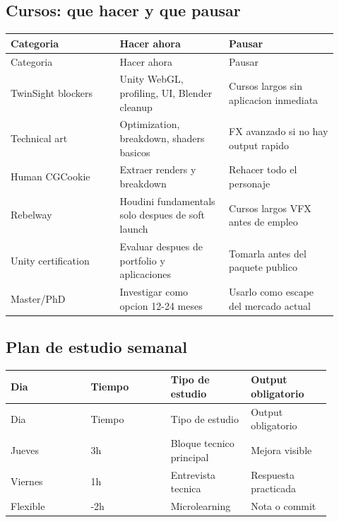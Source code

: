 \subsection{Cursos: que hacer y que pausar}


\begin{center}
\scriptsize
\begin{longtable}{>{\raggedright\arraybackslash}p{0.305\linewidth} >{\raggedright\arraybackslash}p{0.305\linewidth} >{\raggedright\arraybackslash}p{0.305\linewidth}}
\toprule
Categoria & Hacer ahora & Pausar \\
\midrule
\endfirsthead
\toprule
Categoria & Hacer ahora & Pausar \\
\midrule
\endhead
TwinSight blockers & Unity WebGL, profiling, UI, Blender cleanup & Cursos largos sin aplicacion inmediata \\
Technical art & Optimization, breakdown, shaders basicos & FX avanzado si no hay output rapido \\
Human CGCookie & Extraer renders y breakdown & Rehacer todo el personaje \\
Rebelway & Houdini fundamentals solo despues de soft launch & Cursos largos VFX antes de empleo \\
Unity certification & Evaluar despues de portfolio y aplicaciones & Tomarla antes del paquete publico \\
Master/PhD & Investigar como opcion 12-24 meses & Usarlo como escape del mercado actual \\
\bottomrule
\end{longtable}
\end{center}



\subsection{Plan de estudio semanal}


\begin{center}
\scriptsize
\begin{longtable}{>{\raggedright\arraybackslash}p{0.225\linewidth} >{\raggedright\arraybackslash}p{0.225\linewidth} >{\raggedright\arraybackslash}p{0.225\linewidth} >{\raggedright\arraybackslash}p{0.225\linewidth}}
\toprule
Dia & Tiempo & Tipo de estudio & Output obligatorio \\
\midrule
\endfirsthead
\toprule
Dia & Tiempo & Tipo de estudio & Output obligatorio \\
\midrule
\endhead
Jueves & 3h & Bloque tecnico principal & Mejora visible \\
Viernes & 1h & Entrevista tecnica & Respuesta practicada \\
Flexible & 0-2h & Microlearning & Nota o commit \\
\bottomrule
\end{longtable}
\end{center}



